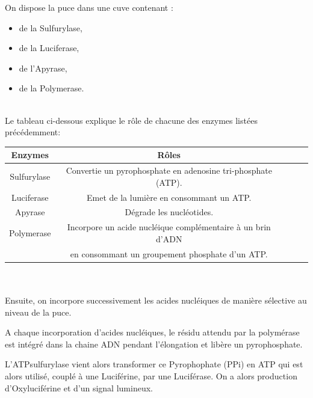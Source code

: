 On dispose la puce dans une cuve contenant :
~~\\
\begin{itemize}
\item de la Sulfurylase,
\item de la Luciferase,
\item de l'Apyrase,
\item de la Polymerase.
\end{itemize}
~~\\
Le tableau ci-dessous explique le rôle de chacune des enzymes listées précédemment:
~~\\

\begin{tabular}{|c|c|c|c|c|}
	\hline
   Enzymes & Rôles \\
   \hline
   Sulfurylase & Convertie un pyrophosphate en adenosine tri-phosphate (ATP). \\
   \hline
   Luciferase & Emet de la lumière en consommant un ATP. \\
   \hline
   Apyrase & Dégrade les nucléotides. \\
   \hline
   Polymerase & Incorpore un acide nucléique complémentaire à un brin d'ADN \\&en consommant un groupement phosphate d'un ATP.\\
   \hline
\end{tabular}

~~\\
~~\\
Ensuite, on incorpore successivement les acides nucléiques de manière sélective au niveau de la puce.

A chaque incorporation d'acides nucléiques, le résidu attendu par la polymérase est intégré dans la chaine ADN pendant l'élongation et libère un pyrophosphate.

L’ATPsulfurylase vient alors transformer ce Pyrophophate (PPi) en ATP qui est alors utilisé, couplé à une Luciférine, par une Luciférase. On a alors production d’Oxyluciférine et d’un signal lumineux.

